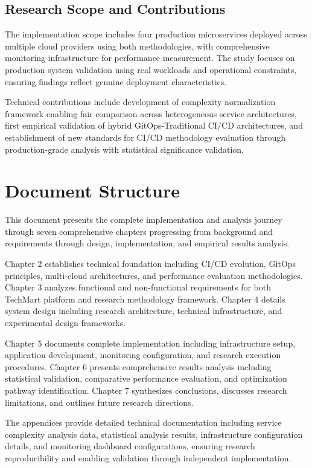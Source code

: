 \subsection{Research Scope and Contributions}
The implementation scope includes four production microservices deployed across multiple cloud providers using both methodologies, with comprehensive monitoring infrastructure for performance measurement. The study focuses on production system validation using real workloads and operational constraints, ensuring findings reflect genuine deployment characteristics.

Technical contributions include development of complexity normalization framework enabling fair comparison across heterogeneous service architectures, first empirical validation of hybrid GitOps-Traditional CI/CD architectures, and establishment of new standards for CI/CD methodology evaluation through production-grade analysis with statistical significance validation.

\section{Document Structure}

This document presents the complete implementation and analysis journey through seven comprehensive chapters progressing from background and requirements through design, implementation, and empirical results analysis.

Chapter 2 establishes technical foundation including CI/CD evolution, GitOps principles, multi-cloud architectures, and performance evaluation methodologies. Chapter 3 analyzes functional and non-functional requirements for both TechMart platform and research methodology framework. Chapter 4 details system design including research architecture, technical infrastructure, and experimental design frameworks.

Chapter 5 documents complete implementation including infrastructure setup, application development, monitoring configuration, and research execution procedures. Chapter 6 presents comprehensive results analysis including statistical validation, comparative performance evaluation, and optimization pathway identification. Chapter 7 synthesizes conclusions, discusses research limitations, and outlines future research directions.

The appendices provide detailed technical documentation including service complexity analysis data, statistical analysis results, infrastructure configuration details, and monitoring dashboard configurations, ensuring research reproducibility and enabling validation through independent implementation.